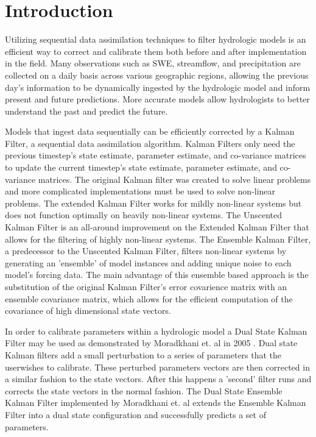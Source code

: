\chapter{Introduction}



	Utilizing sequential data assimilation techniques to filter hydrologic models is an efficient way to correct and calibrate them both before and after implementation in the field. Many observations such as SWE, streamflow, and precipitation are collected on a daily basis across various geographic regions, allowing the previous day's information to be dynamically ingested by the hydrologic model and inform present and future predictions. More accurate models allow hydrologists to better understand the past and predict the future.
	
	Models that ingest data sequentially can be efficiently corrected by a Kalman Filter, a sequential data assimilation algorithm. Kalman Filters only need the previous timestep's state estimate, parameter estimate, and co-variance matrices to update the current timestep's state estimate, parameter estimate, and co-variance matrices. The original Kalman filter\cite{Kalman1960} was created to solve linear problems and more complicated implementations must be used to solve non-linear problems. The extended Kalman Filter\cite{Jazwinski1970} works for mildly non-linear systems but does not function optimally on heavily non-linear systems\cite{Miller1994}. The Unscented Kalman Filter\cite{Julier1997} is an all-around improvement on the Extended Kalman Filter that allows for the filtering of highly non-linear systems. The Ensemble Kalman Filter\cite{Evensen1994}, a predecessor to the Unscented Kalman Filter, filters non-linear systems by generating an 'ensemble' of model instances and adding unique noise to each model's forcing data. The main advantage of this ensemble based approach is the substitution of the original Kalman Filter's error covarience matrix with an ensemble covariance matrix, which allows for the efficient computation of the covariance of high dimensional state vectors. 
	
	In order to calibrate parameters within a hydrologic model a Dual State Kalman Filter may be used as demonstrated by Moradkhani et. al in 2005 \cite{Moradkhani2005}. Dual state Kalman filters add a small perturbation to a series of parameters that the userwishes to calibrate. These perturbed parameters vectors are then corrected in a similar fashion to the state vectors. After this happens a 'second' filter runs and corrects the state vectors in the normal fashion. The Dual State Ensemble Kalman Filter implemented by Moradkhani et. al\cite{Moradkhani2005} extends the Ensemble Kalman Filter into a dual state configuration and successfully predicts a set of parameters.
	
